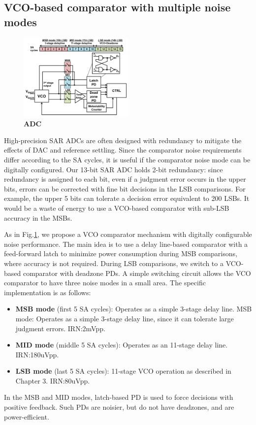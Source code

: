 \documentclass[letterpaper, 10 pt, conference]{ieeeconf}  %
\begin{document}
\subsection{VCO-based comparator with multiple noise modes}
\begin{figure}[ht!]
\centering
\includegraphics[width=0.5\textwidth]{figs/vco-entire.png}
\caption{\textbf{ADC}}
\label{fullvco}
\end{figure}

High-precision SAR ADCs are often designed with redundancy to mitigate the effects of DAC and reference settling. Since the comparator noise requirements differ according to the SA cycles, it is useful if the comparator noise mode can be digitally configured.
Our 13-bit SAR ADC holds 2-bit redundancy: since redundancy is assigned to each bit, even if a judgment error occurs in the upper bits, errors can be corrected with fine bit decisions in the LSB comparisons\cite{kapusta201314b}. For example, the upper 5 bits can tolerate a decision error equivalent to 200 LSBs. It would be a waste of energy to use a VCO-based comparator with sub-LSB accuracy in the MSBs.

As in Fig.\ref{fullvco}, we propose a VCO comparator mechanism with digitally configurable noise performance. 
The main idea is to use a delay line-based comparator with a feed-forward latch to minimize power consumption during MSB comparisons, where accuracy is not required. During LSB comparisons, we switch to a VCO-based comparator with deadzone PDs.
A simple switching circuit allows the VCO comparator to have three noise modes in a small area. The specific implementation is as follows:
\begin{itemize}
\item \textbf{MSB mode} (first 5 SA cycles): Operates as a simple 3-stage delay line. MSB mode: Operates as a simple 3-stage delay line, since it can tolerate large judgment errors. IRN:2mVpp.
\item \textbf{MID mode} (middle 5 SA cycles): Operates as an 11-stage delay line. IRN:180uVpp.
\item \textbf{LSB mode} (last 5 SA cycles): 11-stage VCO operation as described in Chapter 3. IRN:80uVpp.
\end{itemize}
In the MSB and MID modes, latch-based PD is used to force decisions with positive feedback. Such PDs are noisier, but do not have deadzones, and are power-efficient.
\end{document}
